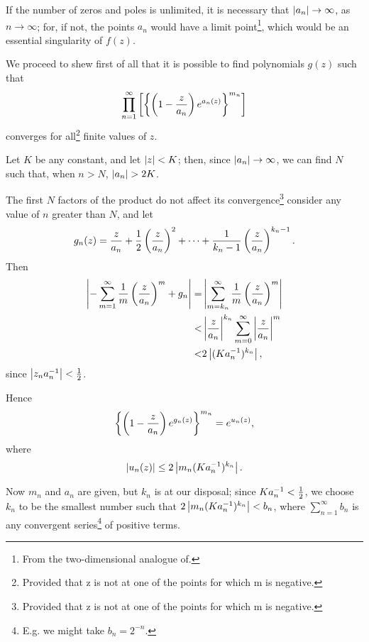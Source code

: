 If the number of zeros and poles is unlimited, it is necessary that
$\left| a_{n} \right| \rightarrow \infty$, as $n \rightarrow \infty$;
for, if not, the points $a_{n}$ would have a limit
point\footnote{From the two-dimensional analogue
  of.},
which would be an essential singularity of $f(z)$.

We proceed to shew first of all that it is possible to find
polynomials $g(z)$ such that
$$
\prod_{n=1}^{\infty}
\left[ 
  \left\{ 
    \left( 
      1
      -
      \frac{z}{a_{n}}
     \right)
    e^{a_{n}(z)}
   \right\}^{m_{n}}
 \right]
$$
converges for all\footnote{Provided that z is not at one of the points
  for which m is negative.} finite values of $z$.

Let $K$ be any constant, and let $\left| z \right| < K$; then, since
$\left| a_{n} \right| \rightarrow \infty$, we can
find $N$ such that, when $n > N$, $\left| a_{n} \right| > 2K$.

The first $N$ factors of the product do not affect its
convergence\footnote{Provided that z is not at one of the points
  for which m is negative.} %
consider any value of $n$ greater than $N$, and let
$$
g_{n}(z)
=
\frac{z}{a_{n}}
+
\frac{1}{2} \left(  \frac{z}{a_{n}}  \right)^{2}
+
\cdots
+
\frac{1}{k_{n}-1}
\left(  \frac{z}{a_{n}}  \right)^{k_{n} - 1}.
$$
Then
\begin{align*}
  \left| 
    -
    \sum_{m=1}^{\infty}
    \frac{1}{m}
    \left( 
      \frac{z}{a_{n}}
     \right)^{m}
    +
    g_{n}
   \right|
  =&
  \left| 
    \sum_{m=k_{n}}^{\infty}
    \frac{1}{m}
    \left( 
      \frac{z}{a_{n}}
     \right)^{m}
   \right|
  \\
  <&
  \left|  \frac{z}{a_{n}}  \right|^{k_{n}}
  \sum_{m=0}^{\infty}
  \left|  \frac{z}{a_{n}}  \right|^{m}
  \\
  <&
  2
  \left|  (K a_{n}^{-1})^{k_{n}}   \right|,
\end{align*}
since
$ \left|  z_{n} a_{n}^{-1}  \right| < \frac{1}{2}$.

Hence
$$
\left\{ 
  \left( 
    1
    -
    \frac{z}{a_{n}}
   \right)
  e^{g_{n}(z)}
 \right\}^{m_{n}}
=
e^{u_{n}(z)},
$$
where
$$
\left|  u_{n}(z)  \right|
\leq
2
\left| 
  m_{n}
  (K a_{n}^{-1})^{k_{n}}
 \right|.
$$

Now $m_{n}$ and $a_{n}$ are given, but $k_{n}$ is at our disposal;
since $K a_{n}^{-1} < \frac{1}{2}$, we
choose $k_{n}$ to be the smallest number such that
$2 \left| m_{n} (K a_{n}^{-1})^{k_{n}} \right| < b_{n}$,
where
$\sum_{n=1}^{\infty} b_{n}$ is any convergent series\footnote{E.g. we
  might take $b_{n} = 2^{-n}$.} of positive terms.

